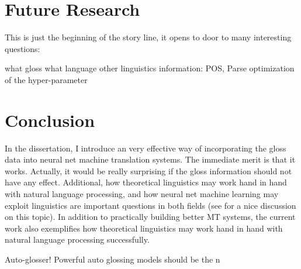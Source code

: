 \documentclass[final]{ua-thesis}
\numberwithin{equation}{section}
\begin{document}
\section{Future Research}

This is just the beginning of the story line, it opens to door to many interesting questions: 

\begin{exe}
\ex what gloss
\ex what language
\ex other linguistics information: POS, Parse
\ex optimization of the hyper-parameter  
\end{exe}

\section{Conclusion}
In the dissertation, I introduce an very effective way of incorporating the gloss data into neural net machine translation systems. 
The immediate merit is that it works. Actually, it would be really surprising if the gloss information should not have any effect.  
Additional, how theoretical linguistics may work hand in hand with natural language processing, and how neural net machine learning may exploit linguistics are important questions in both fields (see \citet{pater2017generative} for a nice discussion on this topic). In addition to practically building better MT systems, the current work also exemplifies how theoretical linguistics may work hand in hand with natural language processing successfully. 

Auto-glosser! 
Powerful auto glossing models should be the n






\end{document}
